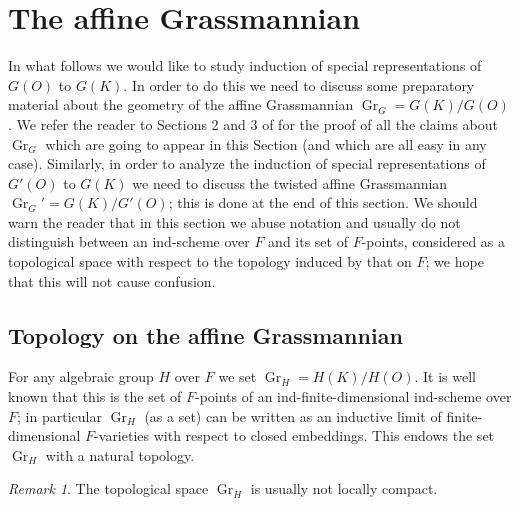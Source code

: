 \documentclass[11pt,a4paper,twoside]{amsart}
\theoremstyle{definition}
\theoremstyle{remark}
\newtheorem{remark}[theorem]{Remark}
\newcommand{\Gr}{\operatorname{Gr}}
\begin{document}
\section{The affine Grassmannian}\label{Gr}
In what follows we would like to study induction of special representations of $G(O)$ to $G(K)$. In order to do this we need to discuss some preparatory material about the geometry of the affine Grassmannian $\Gr_G=G(K)/G(O)$. We refer the reader to Sections 2 and 3 of \cite{MV} for the proof of all the claims about $\Gr_G$ which are going to appear in this Section (and which are all easy in any case).
Similarly, in order to analyze the induction of special representations of $G'(O)$ to $G(K)$ we need to discuss the twisted affine Grassmannian $\Gr_G'=G(K)/G'(O)$; this is done at the end of this section. We should warn the reader that in this section we abuse notation and usually do not distinguish between an ind-scheme over $F$ and its set of $F$-points, considered as a topological space with respect to the topology induced by that on $F$; we hope that this will not cause confusion.
\subsection{Topology on the affine Grassmannian}
For any algebraic group $H$ over $F$ we set $\Gr_H=H(K)/H(O)$. It is well known that this is the set of $F$-points of an ind-finite-dimensional ind-scheme over $F$; in particular $\Gr_H$ (as a set) can be written as an inductive limit of finite-dimensional $F$-varieties with respect to closed embeddings. This endows the set $\Gr_H$ with a natural topology.

\begin{remark}The topological space $\Gr_H$ is usually not locally compact.
\end{remark}
\end{document}
